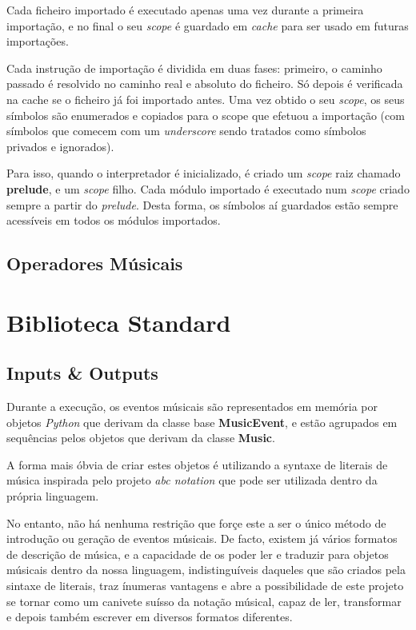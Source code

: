Cada ficheiro importado é executado apenas uma vez durante a primeira importação, e no final o seu \textit{scope} é guardado em \textit{cache} para ser usado em futuras importações.

Cada instrução de importação é dividida em duas fases: primeiro, o caminho passado é resolvido no caminho real e absoluto do ficheiro. Só depois é verificada na cache  se o ficheiro já foi importado antes. Uma vez obtido o seu \textit{scope}, os seus símbolos são enumerados e copiados para o scope que efetuou a importação (com símbolos que comecem com um \textit{underscore} sendo tratados como símbolos privados e ignorados).

Para isso, quando o interpretador é inicializado, é criado um \textit{scope} raiz chamado \textbf{prelude}, e um \textit{scope} filho. Cada módulo importado é executado num \textit{scope} criado sempre a partir do \textit{prelude}. Desta forma, os símbolos aí guardados estão sempre acessíveis em todos os módulos importados.


\subsection{Operadores Músicais}

\section{Biblioteca Standard}
\subsection{Inputs \& Outputs}
Durante a execução, os eventos músicais são representados em memória por objetos \textit{Python} que derivam da classe base \textbf{MusicEvent}, e estão agrupados em sequências pelos objetos que derivam da classe \textbf{Music}.

A forma mais óbvia de criar estes objetos é utilizando a syntaxe de literais de música inspirada pelo projeto \textit{abc notation} que pode ser utilizada dentro da própria linguagem.

No entanto, não há nenhuma restrição que forçe este a ser o único método de introdução ou geração de eventos músicais. De facto, existem já vários formatos de descrição de música, e a capacidade de os poder ler e traduzir para objetos músicais dentro da nossa linguagem, indistinguíveis daqueles que são criados pela sintaxe de literais, traz ínumeras vantagens e abre a possibilidade de este projeto se tornar como um canivete suísso da notação músical, capaz de ler, transformar e depois também escrever em diversos formatos diferentes.


